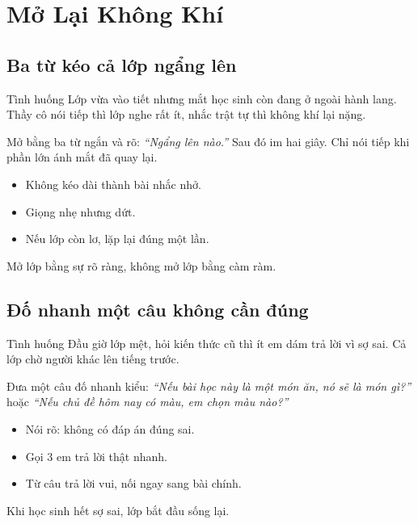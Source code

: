 \chapter{Mở Lại Không Khí}

\section{Ba từ kéo cả lớp ngẩng lên}
\begin{tinhhuong}{Tình huống}
Lớp vừa vào tiết nhưng mắt học sinh còn đang ở ngoài hành lang. Thầy cô nói tiếp thì lớp nghe rất ít, nhắc trật tự thì không khí lại nặng.
\end{tinhhuong}
\begin{goiydungngay}
Mở bằng ba từ ngắn và rõ: \textit{``Ngẩng lên nào.''} Sau đó im hai giây. Chỉ nói tiếp khi phần lớn ánh mắt đã quay lại.
\begin{itemize}
\item Không kéo dài thành bài nhắc nhở.
\item Giọng nhẹ nhưng dứt.
\item Nếu lớp còn lơ, lặp lại đúng một lần.
\end{itemize}
\end{goiydungngay}
\begin{cauchot}
Mở lớp bằng sự rõ ràng, không mở lớp bằng càm ràm.
\end{cauchot}
\ngancach

\section{Đố nhanh một câu không cần đúng}
\begin{tinhhuong}{Tình huống}
Đầu giờ lớp mệt, hỏi kiến thức cũ thì ít em dám trả lời vì sợ sai. Cả lớp chờ người khác lên tiếng trước.
\end{tinhhuong}
\begin{goiydungngay}
Đưa một câu đố nhanh kiểu: \textit{``Nếu bài học này là một món ăn, nó sẽ là món gì?''} hoặc \textit{``Nếu chủ đề hôm nay có màu, em chọn màu nào?''}
\begin{itemize}
\item Nói rõ: không có đáp án đúng sai.
\item Gọi 3 em trả lời thật nhanh.
\item Từ câu trả lời vui, nối ngay sang bài chính.
\end{itemize}
\end{goiydungngay}
\begin{cauchot}
Khi học sinh hết sợ sai, lớp bắt đầu sống lại.
\end{cauchot}
\ngancach

